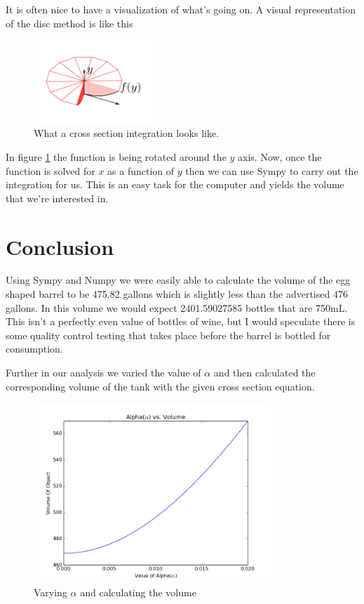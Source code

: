 \documentclass[10pt, reqno]{article}
\numberwithin{equation}{section}
\numberwithin{figure}{section}
\begin{document}
It is often nice to have a visualization of what's going on. A visual representation of the disc method is like this 

\begin{figure}[H] %
\centering
\includegraphics[width=0.4\textwidth]{Disc_integration.png}
\caption{What a cross section integration looks like.\cite{ref:cross_section}}
\label{fig:cross-seciton}
\end{figure}

In figure \ref*{fig:cross-seciton} the function is being rotated around the $y$ axis. 
Now, once the function is solved for $x$ as a function of $y$ then we can use Sympy to carry out the integration for us. This is an easy task for the computer and yields the volume that we're interested in. 

\section{Conclusion}
Using Sympy and Numpy we were easily able to calculate the volume of the egg shaped barrel to be 475.82 gallons which is slightly less than the advertised 476 gallons. In this volume we would expect 2401.59027585 bottles that are 750mL. This isn't a perfectly even value of bottles of wine, but I would speculate there is some quality control testing that takes place before the barrel is bottled for consumption. 

Further in our analysis we varied the value of $\alpha$ and then calculated the corresponding volume of the tank with the given cross section equation. 

\begin{figure}[H] %
\centering
\includegraphics[width=0.8\textwidth]{alpha_volume_plot.png}
\caption{Varying $\alpha$ and calculating the volume}
\label{fig:alpha_volume}
\end{figure}
\end{document}
